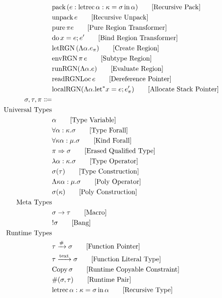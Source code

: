 \documentclass {article}
\begin{document}
\begin{align*}
& \text{pack} \, (e : \text{letrec} \, \alpha : \kappa = \sigma \, \text{in} \, \alpha) \tag*{[Recursive Pack]}\\
& \text{unpack} \, e \tag*{[Recursive Unpack]} \\
& \text{pure} \, \pi e \tag*{[Pure Region Transformer]}\\
& \text{do} \, x = e; e' \tag*{[Bind Region Transformer]} \\
& \text{letRGN} \, (\Lambda \alpha. e_\pi) \tag*{[Create Region]} \\
& \text{envRGN} \, \pi \, e \tag*{[Subtype Region]} \\
& \text{runRGN} (\Lambda \alpha. e) \tag*{[Evaluate Region]} \\
& \text{readRGNLoc} \, e \tag*{[Dereference Pointer]} \\
& \text{localRGN} (\Lambda \alpha. \text{let}^* x = e; e'_\pi ) \tag*{[Allocate Stack Pointer]}
\\
\sigma, \tau, \pi \Coloneqq \\
\text{Universal Types} \\
& \alpha \tag* {[Type Variable]}\\
& \forall \alpha : \kappa. \sigma \tag*{[Type Forall]}\\ 
& \forall \kappa \alpha : \mu. \sigma \tag*{[Kind Forall]}\\
& \pi \Rightarrow \sigma \tag*{[Erased Qualified Type]} \\
& \lambda \alpha : \kappa. \sigma \tag*{[Type Operator]} \\
& \sigma (\tau) \tag*{[Type Construction]} \\
& \Lambda \kappa \alpha : \mu. \sigma \tag*{[Poly Operator]} \\
& \sigma (\kappa) \tag*{[Poly Construction]} \\
\text{Meta Types} \\
& \sigma \to \tau \tag*{[Macro]}\\
& !\sigma \tag*{[Bang]} \\
\text{Runtime Types} \\
& \tau \xrightarrow{\#} \sigma \tag*{[Function Pointer]}\\
& \tau \xrightarrow{\text{text}} \sigma  \tag*{[Function Literal Type]} \\
& \text{Copy} \, \sigma \tag*{[Runtime Copyable Constraint]} \\
& \#(\sigma, \tau) \tag*{[Runtime Pair]} \\
& \text{letrec} \, \alpha : \kappa = \sigma \, \text{in} \, \alpha \tag*{[Recursive Type]} \\

\end{align*}
\end{document}
